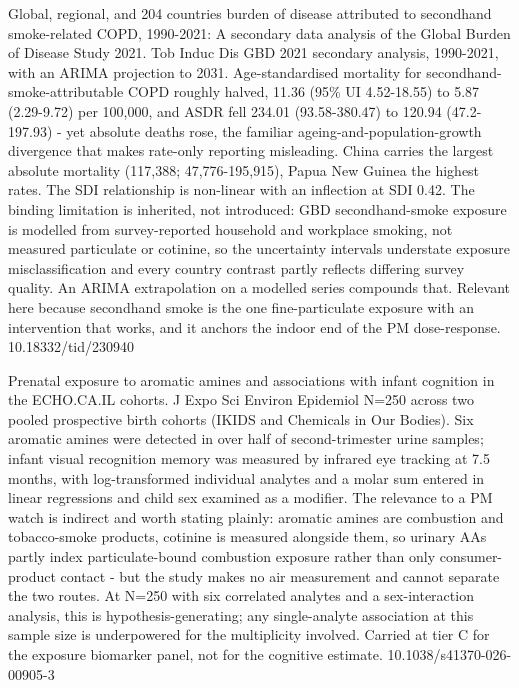 \documentclass[10pt]{article}
\begin{document}

{Global, regional, and 204 countries burden of disease attributed to secondhand smoke-related COPD, 1990-2021: A secondary data analysis of the Global Burden of Disease Study 2021.}
{Tob Induc Dis}
{GBD 2021 secondary analysis, 1990-2021, with an ARIMA projection to 2031. Age-standardised mortality for secondhand-smoke-attributable COPD roughly halved, 11.36 (95\% UI 4.52-18.55) to 5.87 (2.29-9.72) per 100,000, and ASDR fell 234.01 (93.58-380.47) to 120.94 (47.2-197.93) - yet absolute deaths rose, the familiar ageing-and-population-growth divergence that makes rate-only reporting misleading. China carries the largest absolute mortality (117,388; 47,776-195,915), Papua New Guinea the highest rates. The SDI relationship is non-linear with an inflection at SDI 0.42. The binding limitation is inherited, not introduced: GBD secondhand-smoke exposure is modelled from survey-reported household and workplace smoking, not measured particulate or cotinine, so the uncertainty intervals understate exposure misclassification and every country contrast partly reflects differing survey quality. An ARIMA extrapolation on a modelled series compounds that. Relevant here because secondhand smoke is the one fine-particulate exposure with an intervention that works, and it anchors the indoor end of the PM dose-response.}
{10.18332/tid/230940}


{Prenatal exposure to aromatic amines and associations with infant cognition in the ECHO.CA.IL cohorts.}
{J Expo Sci Environ Epidemiol}
{N=250 across two pooled prospective birth cohorts (IKIDS and Chemicals in Our Bodies). Six aromatic amines were detected in over half of second-trimester urine samples; infant visual recognition memory was measured by infrared eye tracking at 7.5 months, with log-transformed individual analytes and a molar sum entered in linear regressions and child sex examined as a modifier. The relevance to a PM watch is indirect and worth stating plainly: aromatic amines are combustion and tobacco-smoke products, cotinine is measured alongside them, so urinary AAs partly index particulate-bound combustion exposure rather than only consumer-product contact - but the study makes no air measurement and cannot separate the two routes. At N=250 with six correlated analytes and a sex-interaction analysis, this is hypothesis-generating; any single-analyte association at this sample size is underpowered for the multiplicity involved. Carried at tier C for the exposure biomarker panel, not for the cognitive estimate.}
{10.1038/s41370-026-00905-3}
\end{document}
